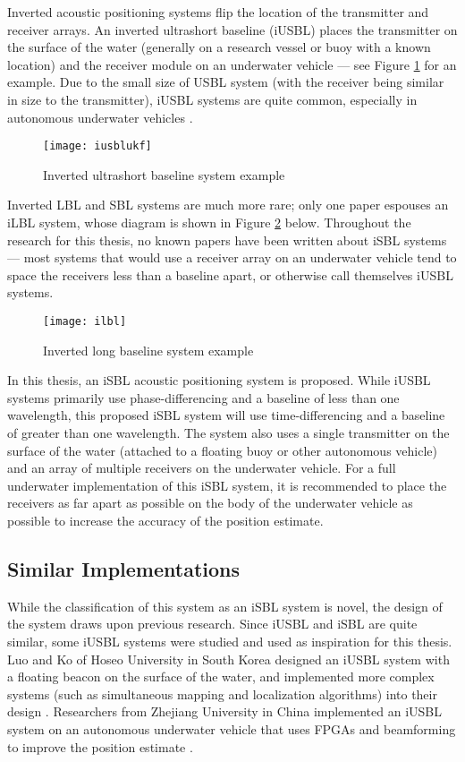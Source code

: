 \documentclass[11pt]{ucthesisCP}
\begin{document}
Inverted acoustic positioning systems flip the location of the transmitter and receiver arrays. An inverted ultrashort baseline (iUSBL) places the transmitter on the surface of the water (generally on a research vessel or buoy with a known location) and the receiver module on an underwater vehicle --- see Figure \ref{fig:iusblukf} for an example. Due to the small size of USBL system (with the receiver being similar in size to the transmitter), iUSBL systems are quite common, especially in autonomous underwater vehicles \cite{noveliusbl} \cite{passiveiusbl}.

\begin{figure}[htbp]
	\centering
	\texttt{[image: iusblukf]}
	\caption{Inverted ultrashort baseline system example \cite{iusblukf}}
	\label{fig:iusblukf}
\end{figure}

Inverted LBL and SBL systems are much more rare; only one paper espouses an iLBL system, whose diagram is shown in Figure \ref{fig:ilbl} below. Throughout the research for this thesis, no known papers have been written about iSBL systems --- most systems that would use a receiver array on an underwater vehicle tend to space the receivers less than a baseline apart, or otherwise call themselves iUSBL systems.

\begin{figure}[htbp]
	\centering
	\texttt{[image: ilbl]}
	\caption{Inverted long baseline system example \cite{ilbl}}
	\label{fig:ilbl}
\end{figure}

In this thesis, an iSBL acoustic positioning system is proposed. While iUSBL systems primarily use phase-differencing and a baseline of less than one wavelength, this proposed iSBL system will use time-differencing and a baseline of greater than one wavelength. The system also uses a single transmitter on the surface of the water (attached to a floating buoy or other autonomous vehicle) and an array of multiple receivers on the underwater vehicle. For a full underwater implementation of this iSBL system, it is recommended to place the receivers as far apart as possible on the body of the underwater vehicle as possible to increase the accuracy of the position estimate.

\subsection{Similar Implementations} \label{ssec:3s1s3}
While the classification of this system as an iSBL system is novel, the design of the system draws upon previous research. Since iUSBL and iSBL are quite similar, some iUSBL systems were studied and used as inspiration for this thesis. Luo and Ko of Hoseo University in South Korea designed an iUSBL system with a floating beacon on the surface of the water, and implemented more complex systems (such as simultaneous mapping and localization algorithms) into their design \cite{iusblukf}. Researchers from Zhejiang University in China implemented an iUSBL system on an autonomous underwater vehicle that uses FPGAs and beamforming to improve the position estimate \cite{passiveiusbl}.
\end{document}
